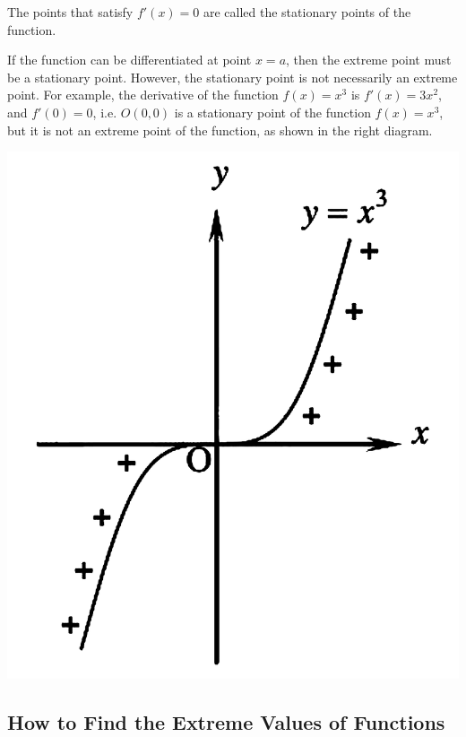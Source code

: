 \documentclass{report}
\begin{document}
\begin{multicols}{2}
    The points that satisfy $f'(x)=0$ are called the stationary points of the
    function.

    If the function can be differentiated at point $x=a$, then the extreme point
    must be a stationary point. However, the stationary point is not necessarily an
    extreme point. For example, the derivative of the function $f(x)=x^3$ is
    $f'(x)=3x^2$, and $f'(0)=0$, i.e. $O(0, 0)$ is a stationary point of the
    function $f(x)=x^3$, but it is not an extreme point of the function, as shown
    in the right diagram. \vfill{}\null{}

    \columnbreak
    \begin{center}
        \includegraphics[scale=0.25]{assets/26-7.png}
    \end{center}
\end{multicols}

\subsection*{How to Find the Extreme Values of Functions}
\end{document}
